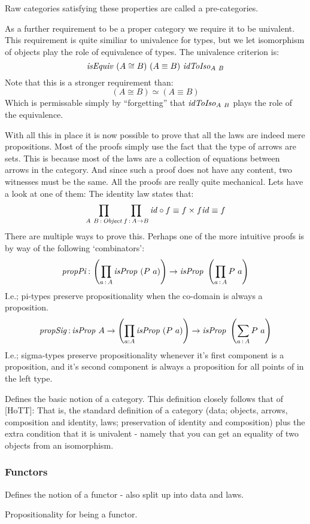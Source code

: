 Raw categories satisfying these properties are called a pre-categories.

As a further requirement to be a proper category we require it to be univalent.
This requirement is quite similiar to univalence for types, but we let
isomorphism of objects play the role of equivalence of types. The univalence
criterion is:
%
$$
\mathit{isEquiv}\ (A \cong B)\ (A \equiv B)\ \mathit{idToIso}_{A\ B}
$$
%
Note that this is a stronger requirement than:
%
$$
(A \cong B) \simeq (A \equiv B)
$$
%
Which is permissable simply by ``forgetting'' that $\mathit{idToIso}_{A\ B}$ plays the
role of the equivalence.

With all this in place it is now possible to prove that all the laws are indeed
mere propositions. Most of the proofs simply use the fact that the type of
arrows are sets. This is because most of the laws are a collection of equations
between arrows in the category. And since such a proof does not have any
content, two witnesses must be the same. All the proofs are really quite
mechanical. Lets have a look at one of them: The identity law states that:
%
$$
\prod_{A\ B \,\mathord{:}\, \mathit{Object}} \prod_{f \,\mathord{:}\, A \to B} \mathit{id} \circ f \equiv f \times f \mathit{id} \equiv f
$$
%
There are multiple ways to prove this. Perhaps one of the more intuitive proofs
is by way of the following `combinators':
%
$$
\mathit{propPi} \tp \left(\prod_{a \tp A} \isProp\ (P\ a)\right) \to \isProp\ \left(\prod_{a \tp A} P\ a\right)
$$
%
I.e.; pi-types preserve propositionality when the co-domain is always a
proposition.
%
$$
\mathit{propSig} \,\mathord{:}\, \mathit{isProp}\ A \to \left(\prod_{a : A} \mathit{isProp}\ (P\ a)\right) \to \mathit{isProp}\ \left(\sum_{a \,\mathord{:}\, A} P\ a\right)
$$
%
I.e.; sigma-types preserve propositionality whenever it's first component is a
proposition, and it's second component is always a proposition for all points of
in the left type.

Defines the basic notion of a category. This definition
closely follows that of [HoTT]: That is, the standard definition of a category
(data; objects, arrows, composition and identity, laws; preservation of identity
and composition) plus the extra condition that it is univalent - namely that you
can get an equality of two objects from an isomorphism.

\subsubsection{Functors}
Defines the notion of a functor - also split up into data and laws.

Propositionality for being a functor.

